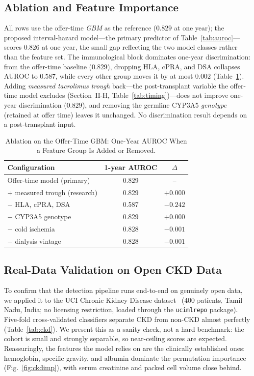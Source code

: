 \documentclass[journal]{IEEEtran}
\begin{document}
\subsection{Ablation and Feature Importance}
All rows use the offer-time \emph{GBM} as the reference ($0.829$ at one year); the proposed interval-hazard model---the primary predictor of Table~\ref{tab:auroc}---scores $0.826$ at one year, the small gap reflecting the two model classes rather than the feature set. The immunological block dominates one-year discrimination: from the offer-time baseline ($0.829$), dropping HLA, cPRA, and DSA collapses AUROC to $0.587$, while every other group moves it by at most $0.002$ (Table~\ref{tab:abl}). Adding \emph{measured tacrolimus trough} back---the post-transplant variable the offer-time model excludes (Section~II-H, Table~\ref{tab:timing})---does not improve one-year discrimination ($0.829$), and removing the germline CYP3A5 \emph{genotype} (retained at offer time) leaves it unchanged. No discrimination result depends on a post-transplant input.

\begin{table}[!t]
\centering
\caption{Ablation on the Offer-Time GBM: One-Year AUROC When a Feature Group Is Added or Removed.}
\label{tab:abl}
\begin{tabular}{@{}lcc@{}}
\toprule
Configuration & 1-year AUROC & $\Delta$ \\
\midrule
Offer-time model (primary) & 0.829 & -- \\
$+$ measured trough (research) & 0.829 & $+0.000$ \\
$-$ HLA, cPRA, DSA & 0.587 & $-0.242$ \\
$-$ CYP3A5 genotype & 0.829 & $+0.000$ \\
$-$ cold ischemia & 0.828 & $-0.001$ \\
$-$ dialysis vintage & 0.828 & $-0.001$ \\
\bottomrule
\end{tabular}
\end{table}

\subsection{Real-Data Validation on Open CKD Data}
To confirm that the detection pipeline runs end-to-end on genuinely open data, we applied it to the UCI Chronic Kidney Disease dataset~\cite{uci} (400 patients, Tamil Nadu, India; no licensing restriction, loaded through the \texttt{ucimlrepo} package). Five-fold cross-validated classifiers separate CKD from non-CKD almost perfectly (Table~\ref{tab:ckd}). We present this as a sanity check, not a hard benchmark: the cohort is small and strongly separable, so near-ceiling scores are expected. Reassuringly, the features the model relies on are the clinically established ones: hemoglobin, specific gravity, and albumin dominate the permutation importance (Fig.~\ref{fig:ckdimp}), with serum creatinine and packed cell volume close behind.
\end{document}
